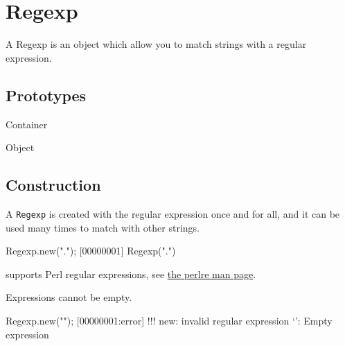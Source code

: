 
\section{Regexp}

A Regexp is an object which allow you to match strings with a regular
expression.

\subsection{Prototypes}
\begin{refObjects}
\item[Container]
\item[Object]
\end{refObjects}

\subsection{Construction}
\label{stdlib:regexp:ctor}

A \lstinline{Regexp} is created with the regular expression once and
for all, and it can be used many times to match with other strings.

\begin{urbiscript}
Regexp.new(".");
[00000001] Regexp(".")
\end{urbiscript}

\us supports Perl regular expressions, see
\href{http://perldoc.perl.org/perlre.html}{the perlre man page}.

Expressions cannot be empty.

\begin{urbiscript}
Regexp.new("");
[00000001:error] !!! new: invalid regular expression `': Empty expression
\end{urbiscript}



